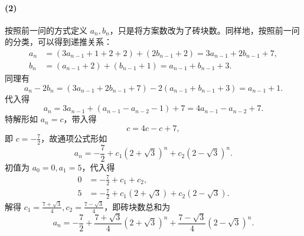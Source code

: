 \documentclass{article}
\begin{document}
\paragraph{(2)} 按照前一问的方式定义 $a_n,b_n$，只是将方案数改为了砖块数。同样地，按照前一问的分类，可以得到递推关系：
\begin{align}
    a_n&=(3a_{n-1}+1+2+2)+(2b_{n-1}+2)=3a_{n-1}+2b_{n-1}+7, \\
    b_n&=(a_{n-1}+2)+(b_{n-1}+1)=a_{n-1}+b_{n-1}+3.
\end{align}
同理有
\begin{equation}
    a_n-2b_n=(3a_{n-1}+2b_{n-1}+7)-2(a_{n-1}+b_{n-1}+3)=a_{n-1}+1.
\end{equation}
代入得
\begin{equation}
    a_n=3a_{n-1}+(a_{n-1}-a_{n-2}-1)+7=4a_{n-1}-a_{n-2}+7.
\end{equation}
特解形如 $a_n=c$，带入得
\begin{equation}
    c=4c-c+7,
\end{equation}
即 $c=-\frac 72$，故通项公式形如
\begin{equation}
    a_n=-\frac 72+c_1(2+\sqrt 3)^n+c_2(2-\sqrt 3)^n.
\end{equation}
初值为 $a_0=0,a_1=5$，代入得
\begin{align}
    0&=-\frac 72+c_1+c_2, \\
    5&=-\frac 72+c_1(2+\sqrt 3)+c_2(2-\sqrt 3).
\end{align}
解得 $c_1=\frac{7+\sqrt 3}{4},c_2=\frac{7-\sqrt 3}{4}$，即砖块数总和为
\begin{equation}
    a_n=-\frac 72+\frac{7+\sqrt 3}{4}(2+\sqrt 3)^n+\frac{7-\sqrt 3}{4}(2-\sqrt 3)^n.
\end{equation}
\end{document}
